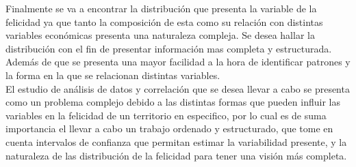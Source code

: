 \documentclass[12pt,oneside,letterpaper,spanish]{article}
\begin{document}
Finalmente se va a encontrar la distribución que presenta la variable de la felicidad ya que tanto la composición de esta como su relación con distintas variables económicas presenta una naturaleza compleja. Se desea hallar la distribución con el fin de presentar información mas completa y estructurada. Además de que se presenta una mayor facilidad a la hora de identificar patrones y la forma en la que se relacionan distintas variables.\\


El estudio de análisis de datos y correlación que se desea llevar a cabo se presenta como un problema complejo debido a las distintas formas que pueden influir las variables en la felicidad de un territorio en especifico, por lo cual es de suma importancia el llevar a cabo un trabajo ordenado y estructurado, que tome en cuenta intervalos de confianza que permitan estimar la variabilidad presente, y la naturaleza de las distribución de la felicidad para tener una visión más completa.

%
%

\label{EndOfText}

\newpage
{}
\thispagestyle{fancy}

\listoffigures
\thispagestyle{fancy}

\listoftables
\thispagestyle{fancy}

\nocite{*}

 
\thispagestyle{fancy}


\label{endOfDoc}
\end{document}
